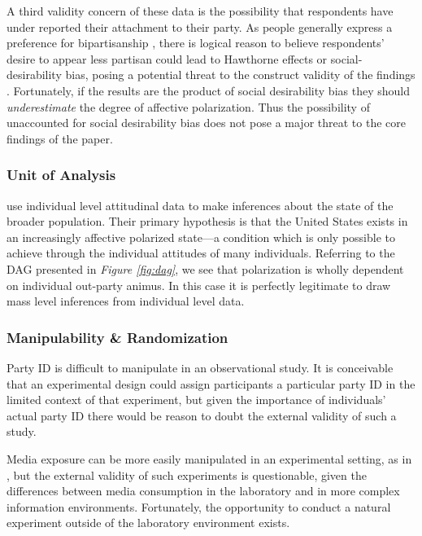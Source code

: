 \documentclass[12pt]{article}
\begin{document}
A third validity concern of these data is the possibility that respondents have under reported their attachment to their party. As people generally express a preference for bipartisanship \citep{harbridge2014public}, there is logical reason to believe respondents' desire to appear less partisan could lead to Hawthorne effects or social-desirability bias, posing a potential threat to the construct validity of the findings \citep[p. 73, Table 3.1 Item 8]{shadish2002experimental}. Fortunately, if the results are the product of social desirability bias they should \textit{underestimate} the degree of affective polarization. Thus the possibility of unaccounted for social desirability bias does not pose a major threat to the core findings of the paper.


\subsubsection{Unit of Analysis}

\citeauthor{iyengar2012affect} use individual level attitudinal data to make inferences about the state of the broader population. Their primary hypothesis is that the United States exists in an increasingly affective polarized state---a condition which is only possible to achieve through the individual attitudes of many individuals. Referring to the DAG presented in \textit{Figure \ref{fig:dag}}, we see that polarization is wholly dependent on individual out-party animus. In this case it is perfectly legitimate to draw mass level inferences from individual level data.

\subsubsection{Manipulability \& Randomization}

Party ID is difficult to manipulate in an observational study. It is conceivable that an experimental design could assign participants a particular party ID in the limited context of that experiment, but given the importance of individuals’ actual party ID there would be reason to doubt the external validity of such a study. 

Media exposure can be more easily manipulated in an experimental setting, as in \citet{mutz2007effects}, but the external validity of such experiments is questionable, given the differences between media consumption in the laboratory and in more complex information environments. Fortunately, the opportunity to conduct a natural experiment outside of the laboratory environment exists.
\end{document}
